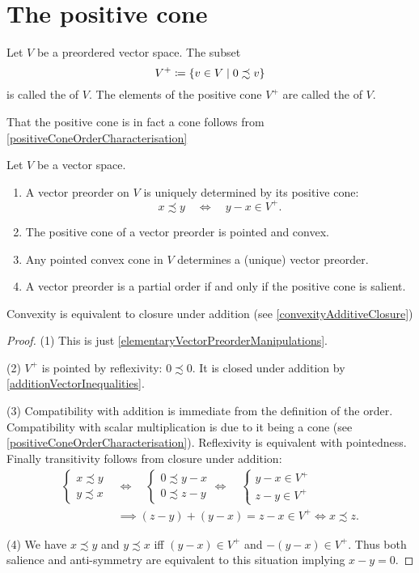 \section{The positive cone}
\begin{definition}
Let $V$ be a preordered vector space. The subset
\[ V^+ \coloneqq \left\{ v\in V \;\middle|\; 0 \precsim v \right\} \]
is called the  of $V$. The elements of the positive cone $V^+$ are called the  of $V$.
\end{definition}
That the positive cone is in fact a cone follows from \ref{positiveConeOrderCharacterisation}
\begin{proposition} \label{positiveCone}
Let $V$ be a vector space.
\begin{enumerate}
\item A vector preorder on $V$ is uniquely determined by its positive cone:
\[ x \precsim y \quad\iff\quad y-x \in V^+. \]
\item The positive cone of a vector preorder is pointed and convex.
\item Any pointed convex cone in $V$ determines a (unique) vector preorder.
\item A vector preorder is a partial order \textup{if and only if} the positive cone is salient.
\end{enumerate}
\end{proposition}
Convexity is equivalent to closure under addition (see \ref{convexityAdditiveClosure})
\begin{proof}
(1) This is just \ref{elementaryVectorPreorderManipulations}.

(2) $V^+$  is pointed by reflexivity: $0\precsim 0$. It is closed under addition by \ref{additionVectorInequalities}.

(3) Compatibility with addition is immediate from the definition of the order. Compatibility with scalar multiplication is due to it being a cone (see \ref{positiveConeOrderCharacterisation}). Reflexivity is equivalent with pointedness. Finally transitivity follows from closure under addition:
\begin{align*}
 \begin{cases}
x\precsim y \\ y\precsim x
\end{cases} &\iff \quad \begin{cases}
0 \precsim y -x \\ 0 \precsim z-y
\end{cases} \iff\quad \begin{cases}
y-x \in V^+ \\ z-y \in V^+
\end{cases} \\
&\implies (z-y)+(y-x) = z-x \in V^+ \iff x \precsim z. 
\end{align*}

(4) We have $x\precsim y$ and $y\precsim x$ iff $(y-x) \in V^+$ and $-(y-x) \in V^+$. Thus both salience and anti-symmetry are equivalent to this situation implying $x-y = 0$.
\end{proof}



